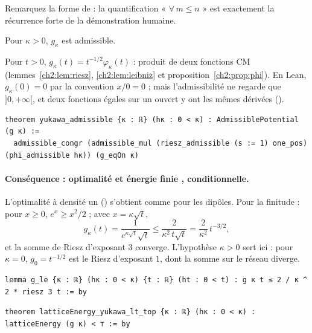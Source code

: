 \noindent Remarquez la forme de  : la quantification « $\forall\,m\le n$ » est exactement la récurrence
forte de la démonstration humaine.

\begin{theorem}\label{ch2:thm:yuk}
Pour $\kappa>0$, $g_\kappa$ est admissible. \tierA
\end{theorem}
\begin{humanproof}
Pour $t>0$, $g_\kappa(t)=t^{-1/2}\varphi_\kappa(t)$ : produit de deux fonctions CM (lemmes~\ref{ch2:lem:riesz},
\ref{ch2:lem:leibniz} et proposition~\ref{ch2:prop:phi}). En Lean, $g_\kappa(0)=0$ par la convention $x/0=0$ ; mais
l'admissibilité ne regarde que $]0,+\infty[$, et deux fonctions égales sur un ouvert y ont les mêmes dérivées
().
\end{humanproof}
\begin{leanbox}
\begin{lstlisting}[style=chdeux]
theorem yukawa_admissible {κ : ℝ} (hκ : 0 < κ) : AdmissiblePotential (g κ) :=
  admissible_congr (admissible_mul (riesz_admissible (s := 1) one_pos) (phi_admissible hκ)) (g_eqOn κ)
\end{lstlisting}
\end{leanbox}

\paragraph{Conséquence : optimalité et énergie finie \tierA, conditionnelle.} L'optimalité à densité un
() s'obtient comme pour les dipôles. Pour la finitude : pour $x\ge0$,
$e^x\ge x^2/2$ ; avec $x=\kappa\sqrt t$,
\[g_\kappa(t)=\frac1{e^{\kappa\sqrt t}\sqrt t}\le\frac{2}{\kappa^2\,t\sqrt t}=\frac2{\kappa^2}\,t^{-3/2},\]
et la somme de Riesz d'exposant $3$ converge. L'hypothèse $\kappa>0$ sert ici : pour $\kappa=0$, $g_0=t^{-1/2}$ est le
Riesz d'exposant $1$, dont la somme sur le réseau diverge.
\begin{leanbox}
\begin{lstlisting}[style=chdeux]
lemma g_le {κ : ℝ} (hκ : 0 < κ) {t : ℝ} (ht : 0 < t) : g κ t ≤ 2 / κ ^ 2 * riesz 3 t := by
\end{lstlisting}
\begin{lstlisting}[style=chdeux]
theorem latticeEnergy_yukawa_lt_top {κ : ℝ} (hκ : 0 < κ) : latticeEnergy (g κ) < ⊤ := by
\end{lstlisting}
\end{leanbox}

